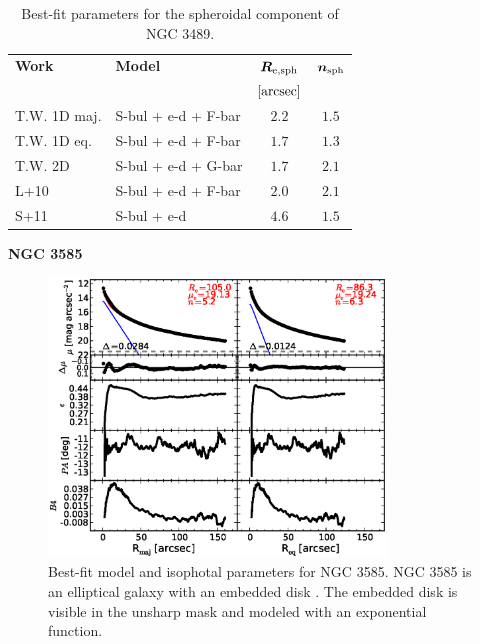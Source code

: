 \documentclass[preprint2]{emulateapj}
\newcommand{\fitfigurewidth}{0.8\textwidth}
\begin{document}
  \begin{table}[h]
  \small
  \caption{Best-fit parameters for the spheroidal component of NGC 3489.}
  \begin{center}
  \begin{tabular}{llcc}
  \hline
  {\bf Work} & {\bf Model}   & $\bm R_{\rm e,sph}$    & $\bm n_{\rm sph}$ \\
    &  &  $[\rm arcsec]$ & \\
  \hline
  T.W. 1D maj. & S-bul + e-d + F-bar & $2.2$  &  $1.5$ \\
  T.W. 1D eq.  & S-bul + e-d + F-bar & $1.7$  &  $1.3$ \\
  T.W. 2D      & S-bul + e-d + G-bar & $1.7$  &  $2.1$ \\
  \hline
  L+10         & S-bul + e-d + F-bar & $2.0$  &  $2.1$ \\
  S+11         & S-bul + e-d & $4.6$  &  $1.5$ \\
  \hline
  \end{tabular}
  \end{center}
  \label{tab:n3489}
  \end{table}


  \clearpage\newpage\noindent

  {\bf NGC 3585 \\}

  \begin{figure}[h]
  \begin{center}
  \includegraphics[width=\fitfigurewidth]{images/n3585_1Dfit.eps}
  \caption{Best-fit model and isophotal parameters for NGC 3585. 
  NGC 3585 is an elliptical galaxy with an embedded disk \cite{scorzabender1995}. 
  The embedded disk is visible in the unsharp mask and modeled with an exponential function. }
  \end{center}
  \end{figure}
\end{document}
